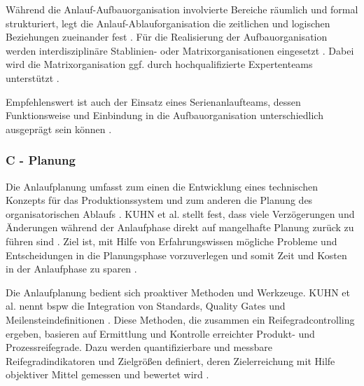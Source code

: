 Während die Anlauf-Aufbauorganisation involvierte Bereiche räumlich und formal strukturiert, legt die Anlauf-Ablauforganisation die zeitlichen und logischen Beziehungen zueinander fest \cite[55]{Schuh2008}.
Für die Realisierung der Aufbauorganisation werden interdisziplinäre Stablinien- oder Matrixorganisationen eingesetzt \cite[77]{Bischoff2007}. Dabei wird die Matrixorganisation ggf. durch hochqualifizierte Expertenteams unterstützt \cite[407]{Schuh2005}. %

Empfehlenswert ist auch der Einsatz eines Serienanlaufteams, dessen Funktionsweise und Einbindung in die Aufbauorganisation unterschiedlich ausgeprägt sein können \cite[79]{Bischoff2007}. 

\subsubsection*{C - Planung}

Die Anlaufplanung umfasst zum einen die Entwicklung eines technischen Konzepts für das Produktionssystem und zum anderen die Planung des organisatorischen Ablaufs \cite[149]{Risse2002}. %
KUHN et al. stellt fest, dass viele Verzögerungen und Änderungen während der Anlaufphase direkt auf mangelhafte Planung zurück zu führen sind \cite[19]{Kuhn2002}. 
Ziel ist, mit Hilfe von Erfahrungswissen mögliche Probleme und Entscheidungen in die Planungsphase vorzuverlegen und somit Zeit und Kosten in der Anlaufphase zu sparen \cite[149]{Risse2002}.  %

Die Anlaufplanung bedient sich proaktiver Methoden und Werkzeuge. KUHN et al. nennt \gls{bspw} die Integration von Standards, Quality Gates und Meilensteindefinitionen \cite[19]{Kuhn2002}. 
Diese Methoden, die zusammen ein Reifegradcontrolling ergeben, basieren auf Ermittlung und Kontrolle erreichter Produkt- und Prozessreifegrade. Dazu werden quantifizierbare und messbare Reifegradindikatoren und Zielgrößen definiert, deren Zielerreichung mit Hilfe objektiver Mittel gemessen und bewertet wird \cite[62--63]{Schuh2008}. 

